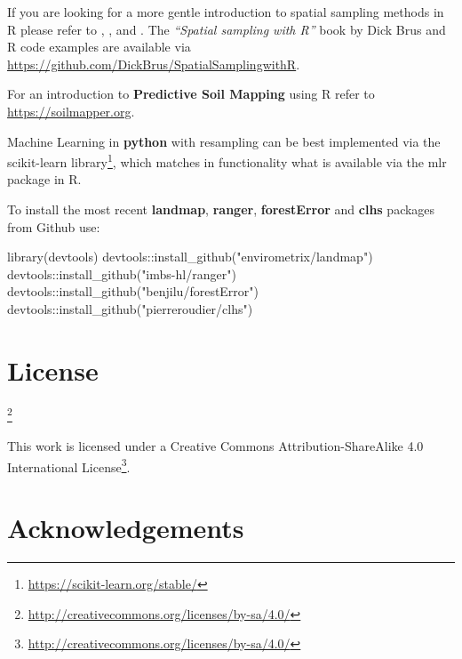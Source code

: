 \documentclass[
  graybox,natbib,nospthms]{svmono}
\newenvironment{Shaded}{\begin{snugshade}}{\end{snugshade}}
\newcommand{\FunctionTok}[1]{\textcolor[rgb]{0,0,0}{#1}}
\newcommand{\NormalTok}[1]{#1}
\newcommand{\SpecialCharTok}[1]{\textcolor[rgb]{0,0,0}{#1}}
\newcommand{\StringTok}[1]{\textcolor[rgb]{0.5,0.5,0.5}{#1}}
\renewcommand{\href}[2]{#2 (\url{#1})}
\renewcommand{\href}[2]{#2\footnote{\url{#1}}}
\begin{document}
If you are looking for a more gentle introduction to spatial sampling methods in R
please refer to \citet{Bivand2013Springer}, \citet{baddeley2015spatial}, \citet{BRUS2019464} and \citet{Brus2021sampling}.
The \emph{``Spatial sampling with R''} book by Dick Brus and R code examples are
available via \url{https://github.com/DickBrus/SpatialSamplingwithR}.

For an introduction to \textbf{Predictive Soil Mapping} using R refer to \url{https://soilmapper.org}.

Machine Learning in \textbf{python} with resampling can be best implemented via the \href{https://scikit-learn.org/stable/}{scikit-learn library},
which matches in functionality what is available via the mlr package in R.

To install the most recent \textbf{landmap}, \textbf{ranger}, \textbf{forestError} and \textbf{clhs} packages from Github use:

\begin{Shaded}
\begin{Highlighting}[]
\FunctionTok{library}\NormalTok{(devtools)}
\NormalTok{devtools}\SpecialCharTok{::}\FunctionTok{install\_github}\NormalTok{(}\StringTok{"envirometrix/landmap"}\NormalTok{)}
\NormalTok{devtools}\SpecialCharTok{::}\FunctionTok{install\_github}\NormalTok{(}\StringTok{"imbs{-}hl/ranger"}\NormalTok{)}
\NormalTok{devtools}\SpecialCharTok{::}\FunctionTok{install\_github}\NormalTok{(}\StringTok{"benjilu/forestError"}\NormalTok{)}
\NormalTok{devtools}\SpecialCharTok{::}\FunctionTok{install\_github}\NormalTok{(}\StringTok{"pierreroudier/clhs"}\NormalTok{)}
\end{Highlighting}
\end{Shaded}

\hypertarget{license}{%
\section*{License}\label{license}}

\href{http://creativecommons.org/licenses/by-sa/4.0/}{}

This work is licensed under a \href{http://creativecommons.org/licenses/by-sa/4.0/}{Creative Commons Attribution-ShareAlike 4.0 International License}.

\hypertarget{acknowledgements}{%
\section*{Acknowledgements}\label{acknowledgements}}
\end{document}

